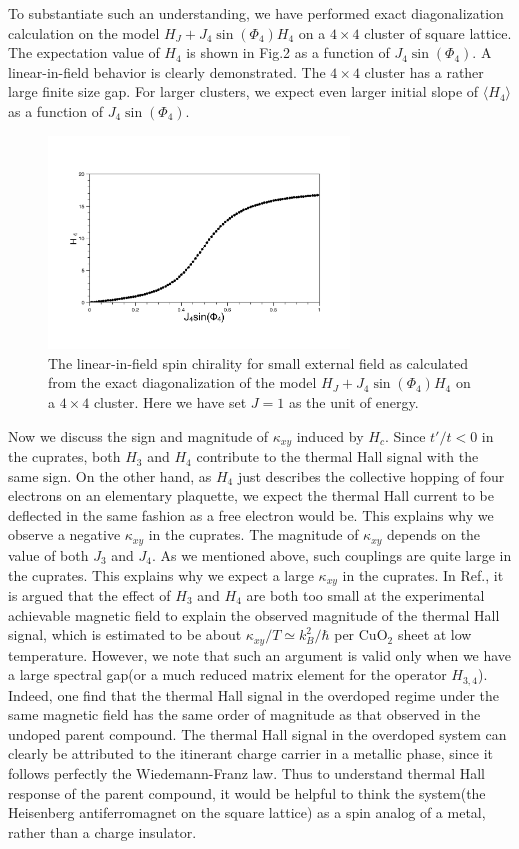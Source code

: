 \documentclass[prb,twocolumn,showpacs]{revtex4}
\begin{document}
To substantiate such an understanding, we have performed exact diagonalization calculation on the model $H_{J}+J_{4}\sin(\Phi_{4})H_{4}$ on a $4\times4$ cluster of square lattice. The expectation value of $H_{4}$ is shown in Fig.2 as a function of $J_{4}\sin(\Phi_{4})$. A linear-in-field behavior is clearly demonstrated. The $4\times4$ cluster has a rather large finite size gap. For larger clusters, we expect even larger initial slope of $\langle H_{4}\rangle$ as a function of $J_{4}\sin(\Phi_{4})$.    
\begin{figure}
\includegraphics[width=8cm]{spin.pdf}
\caption{\label{fig2}
The linear-in-field spin chirality for small external field as calculated from the exact diagonalization of the model $H_{J}+J_{4}\sin(\Phi_{4})H_{4}$ on a $4\times4$ cluster. Here we have set $J=1$ as the unit of energy.}
\end{figure}
 

Now we discuss the sign and magnitude of $\kappa_{xy}$ induced by $H_{c}$. Since $t'/t<0$ in the cuprates, both $H_{3}$ and $H_{4}$ contribute to the thermal Hall signal with the same sign. On the other hand,  as $H_{4}$ just describes the collective hopping of four electrons on an elementary plaquette, we expect the thermal Hall current to be deflected in the same fashion as a free electron would be. This explains why we observe a negative $\kappa_{xy}$ in the cuprates. The magnitude of $\kappa_{xy}$ depends on the value of both $J_{3}$ and $J_{4}$. As we mentioned above, such couplings are quite large in the cuprates. This explains why we expect a large $\kappa_{xy}$ in the cuprates. In Ref., it is argued that the effect of $H_{3}$ and $H_{4}$ are both too small at the experimental achievable magnetic field to explain the observed magnitude of the thermal Hall signal, which is estimated to be about $\kappa_{xy}/T\simeq k^{2}_{B}/\hbar$ per CuO$_{2}$ sheet at low temperature. However, we note that such an argument is valid only when we have a large spectral gap(or a much reduced matrix element for the operator $H_{3,4}$). Indeed, one find that the thermal Hall signal in the overdoped regime under the same magnetic field has the same order of magnitude as that observed in the undoped parent compound. The thermal Hall signal in the overdoped system can clearly be attributed to the itinerant charge carrier in a metallic phase, since it follows perfectly the Wiedemann-Franz law. Thus to understand thermal Hall response of the parent compound, it would be helpful to think the system(the Heisenberg antiferromagnet on the square lattice) as a spin analog of a metal, rather than a charge insulator. 
\end{document}
